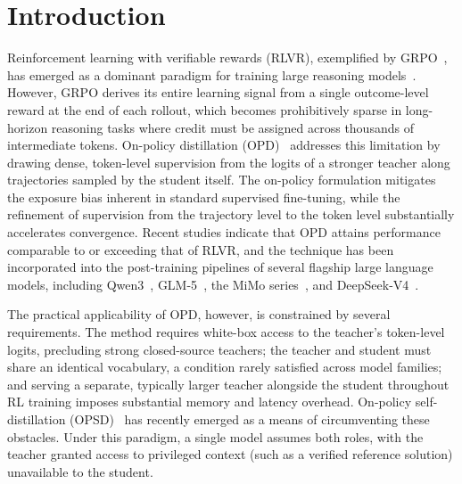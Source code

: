 \section{Introduction}
\label{sec:intro}
Reinforcement learning with verifiable rewards (RLVR), exemplified by GRPO~\citep{shao2024deepseekmath}, has emerged as a dominant paradigm for training large reasoning models~\citep{guo2025deepseek,yang2025qwen3,zeng2026glm,hong2025glm,chen2026minimax,team2026kimi}. However, GRPO derives its entire learning signal from a single outcome-level reward at the end of each rollout, which becomes prohibitively sparse in long-horizon reasoning tasks where credit must be assigned across thousands of intermediate tokens. On-policy distillation (OPD)~\citep{agarwal2024policy,song2026survey,gu2024minillm} addresses this limitation by drawing dense, token-level supervision from the logits of a stronger teacher along trajectories sampled by the student itself. The on-policy formulation mitigates the exposure bias inherent in standard supervised fine-tuning, while the refinement of supervision from the trajectory level to the token level substantially accelerates convergence. Recent studies indicate that OPD attains performance comparable to or exceeding that of RLVR, and the technique has been incorporated into the post-training pipelines of several flagship large language models, including Qwen3~\citep{yang2025qwen3}, GLM-5~\citep{zeng2026glm}, the MiMo series~\citep{xiao2026mimo}, and DeepSeek-V4~\citep{deepseekai2026deepseekv4}.

The practical applicability of OPD, however, is constrained by several requirements. The method requires white-box access to the teacher's token-level logits, precluding strong closed-source teachers; the teacher and student must share an identical vocabulary, a condition rarely satisfied across model families; and serving a separate, typically larger teacher alongside the student throughout RL training imposes substantial memory and latency overhead. On-policy self-distillation (OPSD)~\citep{zhao2026self,hubotter2026reinforcement,yang2026self,he2026self,li2026unifying,jin2026unisd,kim2026rebellious,shen2026anti,shen2026generic,ke2026respecting,wang2026trace} has recently emerged as a means of circumventing these obstacles. Under this paradigm, a single model assumes both roles, with the teacher granted access to privileged context (such as a verified reference solution) unavailable to the student. 

